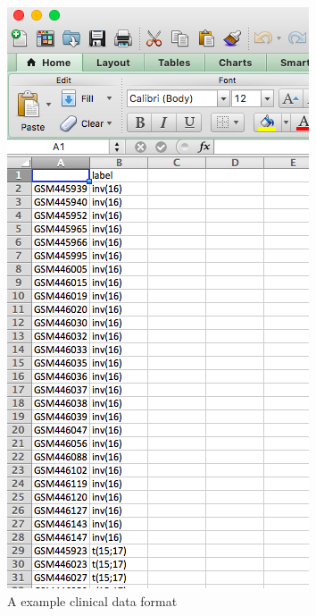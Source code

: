 \begin{figure}[H]
\begin{center}
\includegraphics[scale=0.5]{./figure/clinicalData}
\caption{A example clinical data format}
\label{fig:clinical}
\end{center}
\end{figure}
